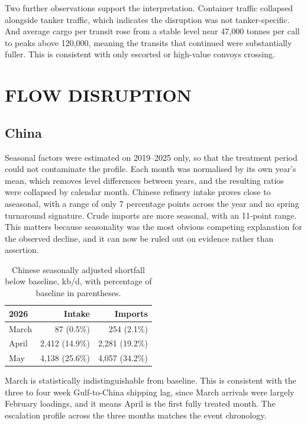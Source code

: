 \documentclass[11pt]{article}
\begin{document}
Two further observations support the interpretation. Container traffic
collapsed alongside tanker traffic, which indicates the disruption was
not tanker-specific. And average cargo per transit rose from a stable
level near 47,000 tonnes per call to peaks above 120,000, meaning the
transits that continued were substantially fuller. This is consistent
with only escorted or high-value convoys crossing.

\section{FLOW DISRUPTION}

\subsection*{China}

Seasonal factors were estimated on 2019--2025 only, so that the
treatment period could not contaminate the profile. Each month was
normalised by its own year's mean, which removes level differences
between years, and the resulting ratios were collapsed by calendar
month. Chinese refinery intake proves close to aseasonal, with a range
of only 7 percentage points across the year and no spring turnaround
signature. Crude imports are more seasonal, with an 11-point range.
This matters because seasonality was the most obvious competing
explanation for the observed decline, and it can now be ruled out on
evidence rather than assertion.

\begin{table}[htbp]
\centering\small
\begin{tabular}{lrr}
\toprule
\textbf{2026} & \textbf{Intake} & \textbf{Imports} \\
\midrule
March & 87 (0.5\%) & 254 (2.1\%) \\
April & 2{,}412 (14.9\%) & 2{,}281 (19.2\%) \\
May & 4{,}138 (25.6\%) & 4{,}057 (34.2\%) \\
\bottomrule
\end{tabular}
\caption{Chinese seasonally adjusted shortfall below baseline, kb/d, with percentage of baseline in parentheses.}
\label{tab:china-flows}
\end{table}

March is
statistically indistinguishable from baseline. This is consistent with
the three to four week Gulf-to-China shipping lag, since March arrivals
were largely February loadings, and it means April is the first fully
treated month. The escalation profile across the three months matches
the event chronology.
\end{document}

